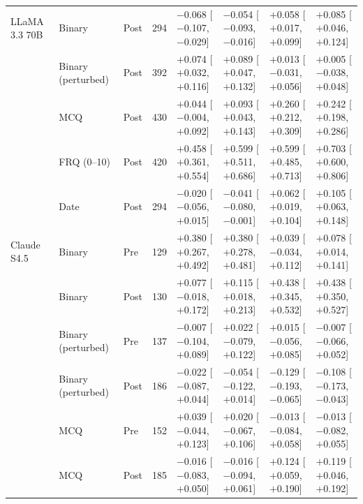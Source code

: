 \begin{table}[p]
\begin{tabular}{l l l r l l l l}
\addlinespace
LLaMA 3.3 70B & Binary & Post & 294 & $-$0.068 {\scriptsize[$-$0.107, $-$0.029]} & $-$0.054 {\scriptsize[$-$0.093, $-$0.016]} & $+$0.058 {\scriptsize[$+$0.017, $+$0.099]} & $+$0.085 {\scriptsize[$+$0.046, $+$0.124]} \\
 & Binary (perturbed) & Post & 392 & $+$0.074 {\scriptsize[$+$0.032, $+$0.116]} & $+$0.089 {\scriptsize[$+$0.047, $+$0.132]} & $+$0.013 {\scriptsize[$-$0.031, $+$0.056]} & $+$0.005 {\scriptsize[$-$0.038, $+$0.048]} \\
 & MCQ & Post & 430 & $+$0.044 {\scriptsize[$-$0.004, $+$0.092]} & $+$0.093 {\scriptsize[$+$0.043, $+$0.143]} & $+$0.260 {\scriptsize[$+$0.212, $+$0.309]} & $+$0.242 {\scriptsize[$+$0.198, $+$0.286]} \\
 & FRQ (0--10) & Post & 420 & $+$0.458 {\scriptsize[$+$0.361, $+$0.554]} & $+$0.599 {\scriptsize[$+$0.511, $+$0.686]} & $+$0.599 {\scriptsize[$+$0.485, $+$0.713]} & $+$0.703 {\scriptsize[$+$0.600, $+$0.806]} \\
 & Date & Post & 294 & $-$0.020 {\scriptsize[$-$0.056, $+$0.015]} & $-$0.041 {\scriptsize[$-$0.080, $-$0.001]} & $+$0.062 {\scriptsize[$+$0.019, $+$0.104]} & $+$0.105 {\scriptsize[$+$0.063, $+$0.148]} \\
\addlinespace
Claude S4.5 & Binary & Pre & 129 & $+$0.380 {\scriptsize[$+$0.267, $+$0.492]} & $+$0.380 {\scriptsize[$+$0.278, $+$0.481]} & $+$0.039 {\scriptsize[$-$0.034, $+$0.112]} & $+$0.078 {\scriptsize[$+$0.014, $+$0.141]} \\
 & Binary & Post & 130 & $+$0.077 {\scriptsize[$-$0.018, $+$0.172]} & $+$0.115 {\scriptsize[$+$0.018, $+$0.213]} & $+$0.438 {\scriptsize[$+$0.345, $+$0.532]} & $+$0.438 {\scriptsize[$+$0.350, $+$0.527]} \\
 & Binary (perturbed) & Pre & 137 & $-$0.007 {\scriptsize[$-$0.104, $+$0.089]} & $+$0.022 {\scriptsize[$-$0.079, $+$0.122]} & $+$0.015 {\scriptsize[$-$0.056, $+$0.085]} & $-$0.007 {\scriptsize[$-$0.066, $+$0.052]} \\
 & Binary (perturbed) & Post & 186 & $-$0.022 {\scriptsize[$-$0.087, $+$0.044]} & $-$0.054 {\scriptsize[$-$0.122, $+$0.014]} & $-$0.129 {\scriptsize[$-$0.193, $-$0.065]} & $-$0.108 {\scriptsize[$-$0.173, $-$0.043]} \\
 & MCQ & Pre & 152 & $+$0.039 {\scriptsize[$-$0.044, $+$0.123]} & $+$0.020 {\scriptsize[$-$0.067, $+$0.106]} & $-$0.013 {\scriptsize[$-$0.084, $+$0.058]} & $-$0.013 {\scriptsize[$-$0.082, $+$0.055]} \\
 & MCQ & Post & 185 & $-$0.016 {\scriptsize[$-$0.083, $+$0.050]} & $-$0.016 {\scriptsize[$-$0.094, $+$0.061]} & $+$0.124 {\scriptsize[$+$0.059, $+$0.190]} & $+$0.119 {\scriptsize[$+$0.046, $+$0.192]} \\

\end{tabular}
\end{table}

